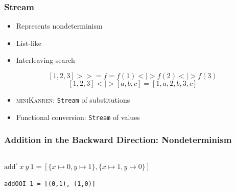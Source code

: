 \documentclass[xcolor=table, aspectratio=169]{beamer}
\newcommand{\mk}{\textsc{miniKanren}\xspace}
\begin{document}
\begin{frame}[fragile]
  \frametitle{Stream}

  \begin{center}
    \begin{minipage}{0.4\textwidth}
      \begin{itemize}
          \item Represents nondeterminism
          \item List-like
          \item Interleaving search
      \end{itemize}
    \end{minipage}
  \end{center}

\vfill

  \begin{center}
      \[ \left[1, 2, 3\right] >>= f = f(1) < \mid > f(2) < \mid > f(3)\] 
      \[ \left[1, 2, 3\right] < \mid > \left[a, b, c\right] = \left[1, a, 2, b, 3, c\right] \] 
  \end{center}

  \vfill

  \begin{center}
    \begin{minipage}{0.5\textwidth}
      \begin{itemize}
          \item \mk: \lstinline{Stream} of substitutions
          \item Functional conversion: \lstinline{Stream} of values
      \end{itemize}
    \end{minipage}
  \end{center}
\end{frame}


\begin{frame}[fragile]
  \frametitle{Addition in the Backward Direction: Nondeterminism}
\begin{columns}
  \begin{column}[t]{0.49\textwidth}
    
  \end{column}
  \begin{column}[t]{0.49\textwidth}
    
  \end{column}
\end{columns}

\vfill
$\text{add}^{\circ}\ x\ y\ 1 = \left[\{x \mapsto  0, y \mapsto  1\}, \{x \mapsto  1, y \mapsto  0\} \right]$

\vfill

\lstinline{addOOI 1 = [(0,1), (1,0)]}

\end{frame}
\end{document}
